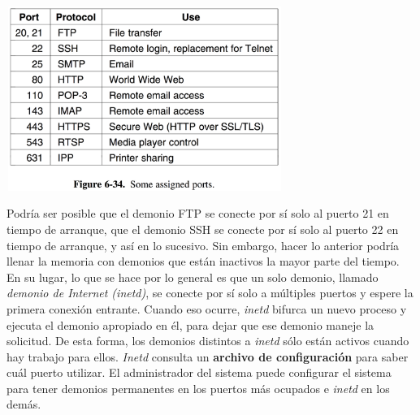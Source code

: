 \documentclass[10pt,a4paper]{report}
\begin{document}
	\begin{center}
	\includegraphics[width=9cm, height=6cm]{./imagenes/protocolo.png} 
	\end{center}

\par Podría ser posible que el demonio FTP se conecte por sí solo al puerto 21 en 
tiempo de arranque, que el demonio SSH se conecte por sí solo al puerto 22 en tiempo 
de arranque, y así en lo sucesivo. Sin embargo, hacer lo anterior podría llenar la 
memoria con demonios que están inactivos la mayor parte del tiempo. En su lugar, lo 
que se hace por lo general es que un solo demonio, llamado \emph{demonio de 
Internet (inetd)}, se conecte por sí solo a múltiples puertos y espere la primera 
conexión entrante. Cuando eso ocurre, \emph{inetd} bifurca un nuevo proceso y 
ejecuta el demonio apropiado en él, para dejar que ese demonio maneje la solicitud. De 
esta forma, los demonios distintos a \textit{inetd} sólo están activos cuando hay 
trabajo para ellos. \emph{Inetd} consulta un \textbf{archivo de configuración} para 
saber cuál puerto utilizar. El administrador del sistema puede 
configurar el sistema para tener demonios permanentes en los puertos más ocupados 
e \emph{inetd} en los demás.
\end{document}
